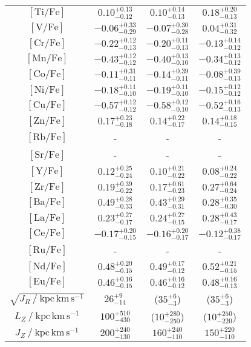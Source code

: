 \begin{table}
\begin{tabular}{cccc}
$\mathrm{[Ti/Fe]}$ & $0.10_{-0.12}^{+0.13}$ & $0.10_{-0.13}^{+0.14}$ & $0.18_{-0.13}^{+0.20}$ \\
$\mathrm{[V/Fe]}$ & $-0.06_{-0.29}^{+0.33}$ & $-0.07_{-0.28}^{+0.30}$ & $0.04_{-0.32}^{+0.31}$ \\
$\mathrm{[Cr/Fe]}$ & $-0.22_{-0.13}^{+0.12}$ & $-0.20_{-0.13}^{+0.11}$ & $-0.13_{-0.12}^{+0.14}$ \\
$\mathrm{[Mn/Fe]}$ & $-0.43_{-0.12}^{+0.12}$ & $-0.40_{-0.10}^{+0.13}$ & $-0.34_{-0.12}^{+0.13}$ \\
$\mathrm{[Co/Fe]}$ & $-0.11_{-0.11}^{+0.31}$ & $-0.14_{-0.11}^{+0.39}$ & $-0.08_{-0.13}^{+0.39}$ \\
$\mathrm{[Ni/Fe]}$ & $-0.18_{-0.10}^{+0.11}$ & $-0.19_{-0.10}^{+0.11}$ & $-0.15_{-0.12}^{+0.12}$ \\
$\mathrm{[Cu/Fe]}$ & $-0.57_{-0.12}^{+0.12}$ & $-0.58_{-0.10}^{+0.12}$ & $-0.52_{-0.13}^{+0.16}$ \\
$\mathrm{[Zn/Fe]}$ & $0.17_{-0.18}^{+0.23}$ & $0.14_{-0.17}^{+0.22}$ & $0.14_{-0.15}^{+0.18}$ \\
$\mathrm{[Rb/Fe]}$ & - & - & - \\
$\mathrm{[Sr/Fe]}$ & - & - & - \\
$\mathrm{[Y/Fe]}$ & $0.12_{-0.24}^{+0.25}$ & $0.10_{-0.22}^{+0.21}$ & $0.08_{-0.22}^{+0.24}$ \\
$\mathrm{[Zr/Fe]}$ & $0.19_{-0.22}^{+0.39}$ & $0.17_{-0.23}^{+0.61}$ & $0.27_{-0.24}^{+0.64}$ \\
$\mathrm{[Ba/Fe]}$ & $0.49_{-0.33}^{+0.28}$ & $0.43_{-0.31}^{+0.29}$ & $0.28_{-0.30}^{+0.35}$ \\
$\mathrm{[La/Fe]}$ & $0.23_{-0.17}^{+0.27}$ & $0.24_{-0.15}^{+0.27}$ & $0.28_{-0.17}^{+0.43}$ \\
$\mathrm{[Ce/Fe]}$ & $-0.17_{-0.15}^{+0.20}$ & $-0.16_{-0.17}^{+0.20}$ & $-0.12_{-0.17}^{+0.38}$ \\
$\mathrm{[Ru/Fe]}$ & - & - & - \\
$\mathrm{[Nd/Fe]}$ & $0.48_{-0.15}^{+0.20}$ & $0.49_{-0.12}^{+0.17}$ & $0.52_{-0.15}^{+0.21}$ \\
$\mathrm{[Eu/Fe]}$ & $0.46_{-0.15}^{+0.16}$ & $0.46_{-0.12}^{+0.16}$ & $0.48_{-0.13}^{+0.16}$ \\
\hline
$\sqrt{J_R~/~\mathrm{kpc\,km\,s^{-1}}}$ & $26_{-14}^{+9}$ & ($35_{-3}^{+6}$) & ($35_{-3}^{+6}$) \\
$L_Z~/~\mathrm{kpc\,km\,s^{-1}}$ & $100_{-430}^{+510}$ & ($10_{-250}^{+280}$) & ($10_{-220}^{+250}$) \\
$J_Z~/~\mathrm{kpc\,km\,s^{-1}}$ & $200_{-130}^{+240}$ & $160_{-110}^{+240}$ & $150_{-110}^{+220}$ \\

\end{tabular}
\end{table}
